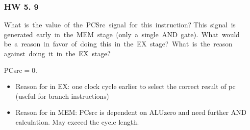 \documentclass[xcolor=table]{beamer}
\begin{document}
\begin{mdframe}%

\frametitle{HW 5. 9}\label{heading-sec-hw-5-9}%

\noindent{} What  is  the  value  of  the  PCSrc  signal  for  this  instruction?  This  signal  is generated  early  in  the  MEM  stage  (only  a  single  AND  gate).  What  would  be  a  reason  in  favor  of  doing  this  in  the  EX  stage?  What  is  the  reason  against  doing  it  in  the  EX  stage?%

\mdhr{}%

\noindent{}PCsrc = 0.%

\begin{itemize}[noitemsep,topsep=\mdcompacttopsep]%

\item{}Reason for in EX: one clock cycle earlier to select the correct result of pc (useful for branch instructions)%

\item{}Reason for in MEM: PCsrc is dependent on ALUzero and need further AND calculation. May exceed the cycle length.%
\end{itemize}%
\end{mdframe}\label{sec-hw-5-9}%
\end{document}
